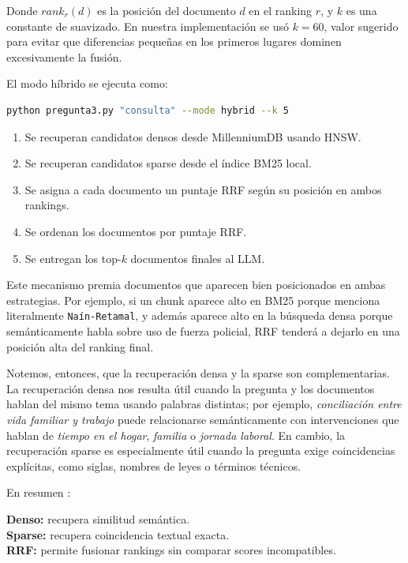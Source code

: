 \documentclass{article}
\begin{document}
Donde $rank_r(d)$ es la posición del documento $d$ en el ranking $r$, y $k$ es una constante de suavizado. En nuestra implementación se usó $k = 60$, valor sugerido para evitar que diferencias pequeñas en los primeros lugares dominen excesivamente la fusión.

El modo híbrido se ejecuta como:

\begin{lstlisting}[language=Bash]
python pregunta3.py "consulta" --mode hybrid --k 5
\end{lstlisting}

\begin{enumerate}
    \item Se recuperan candidatos densos desde MillenniumDB usando HNSW.
    \item Se recuperan candidatos sparse desde el índice BM25 local.
    \item Se asigna a cada documento un puntaje RRF según su posición en ambos rankings.
    \item Se ordenan los documentos por puntaje RRF.
    \item Se entregan los top-$k$ documentos finales al LLM.
\end{enumerate}

Este mecanismo premia documentos que aparecen bien posicionados en ambas estrategias. Por ejemplo, si un chunk aparece alto en BM25 porque menciona literalmente \texttt{Naín-Retamal}, y además aparece alto en la búsqueda densa porque semánticamente habla sobre uso de fuerza policial, RRF tenderá a dejarlo en una posición alta del ranking final.

Notemos, entonces, que la recuperación densa y la sparse son complementarias. La recuperación densa nos resulta útil cuando la pregunta y los documentos hablan del mismo tema usando palabras distintas; por ejemplo, \textit{conciliación entre vida familiar y trabajo} puede relacionarse semánticamente con intervenciones que hablan de \textit{tiempo en el hogar}, \textit{familia} o \textit{jornada laboral}. En cambio, la recuperación sparse es especialmente útil cuando la pregunta exige coincidencias explícitas, como siglas, nombres de leyes o términos técnicos.

En resumen : 
\begin{mdframed}
\textbf{Denso:} recupera similitud semántica. \\
\textbf{Sparse:} recupera coincidencia textual exacta. \\
\textbf{RRF:} permite fusionar rankings sin comparar scores incompatibles.
\end{mdframed}
\end{document}
